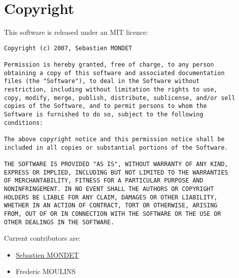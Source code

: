 \section{Copyright}
\label{sec:copyright}

This software is released under an MIT licence:

\begin{verbatim}
Copyright (c) 2007, Sebastien MONDET

Permission is hereby granted, free of charge, to any person
obtaining a copy of this software and associated documentation
files (the "Software"), to deal in the Software without
restriction, including without limitation the rights to use,
copy, modify, merge, publish, distribute, sublicense, and/or sell
copies of the Software, and to permit persons to whom the
Software is furnished to do so, subject to the following
conditions:

The above copyright notice and this permission notice shall be
included in all copies or substantial portions of the Software.

THE SOFTWARE IS PROVIDED "AS IS", WITHOUT WARRANTY OF ANY KIND,
EXPRESS OR IMPLIED, INCLUDING BUT NOT LIMITED TO THE WARRANTIES
OF MERCHANTABILITY, FITNESS FOR A PARTICULAR PURPOSE AND
NONINFRINGEMENT. IN NO EVENT SHALL THE AUTHORS OR COPYRIGHT
HOLDERS BE LIABLE FOR ANY CLAIM, DAMAGES OR OTHER LIABILITY,
WHETHER IN AN ACTION OF CONTRACT, TORT OR OTHERWISE, ARISING
FROM, OUT OF OR IN CONNECTION WITH THE SOFTWARE OR THE USE OR
OTHER DEALINGS IN THE SOFTWARE.
\end{verbatim}
Current contributors are:

\begin{itemize}
\item \href{http://sebmdt.googlepages.com}{Sebastien MONDET}
\item Frederic MOULINS
\end{itemize}




